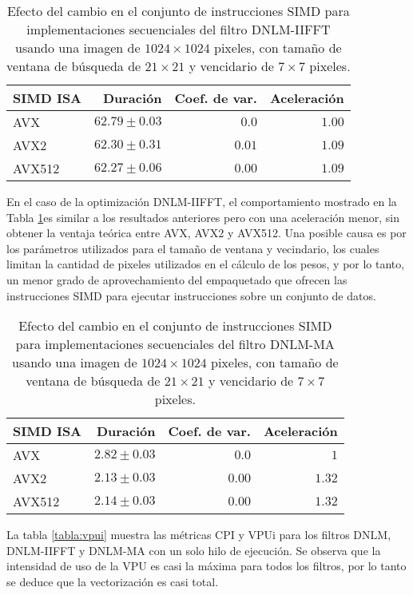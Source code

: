 \begin{table}
\protect\caption[Efecto de vectorizaci\'on con instrucciones SIMD para el filtro DNLM-IIFFT]{Efecto del cambio en el conjunto de instrucciones SIMD para implementaciones secuenciales del filtro DNLM-IIFFT usando una imagen de  $1024 \times 1024$ pixeles, con tama\~no de ventana de b\'usqueda de $21 \times 21$ y vencidario de $7 \times 7$ pixeles. \label{tabla:vec_dnlm_iifft}}
\centering
\begin{tabular}{lrrr}
SIMD ISA & Duraci\'on \left[s\right]& Coef. de var. & Aceleraci\'on \left[x\right] \tabularnewline
\hline
AVX & $62.79\pm0.03$ & $0.0$ & $1.00$\tabularnewline
AVX2 & $62.30\pm0.31$ & $0.01$ & $1.09$\tabularnewline
AVX512 & $62.27\pm 0.06$ & $0.00$ & $1.09$ \tabularnewline
\end{tabular}
\end{table}


En el caso de la optimizaci\'on DNLM-IIFFT, el comportamiento mostrado en la Tabla \ref{tabla:vec_dnlm_iifft}es similar a los resultados anteriores pero con una aceleraci\'on menor, sin obtener la ventaja te\'orica entre AVX, AVX2 y AVX512. Una posible causa es por los par\'ametros utilizados para el tama\~no de ventana y vecindario, los cuales limitan la cantidad de pixeles utilizados en el c\'alculo de los pesos, y por lo tanto, un menor grado de aprovechamiento del empaquetado que ofrecen las instrucciones SIMD para ejecutar instrucciones sobre un conjunto de datos.

\begin{table}
\protect\caption[Efecto de vectorizaci\'on con instrucciones SIMD para el filtro DNLM-MA]{Efecto del cambio en el conjunto de instrucciones SIMD para implementaciones secuenciales del filtro DNLM-MA usando una imagen de  $1024 \times 1024$ pixeles, con tama\~no de ventana de b\'usqueda de $21 \times 21$ y vencidario de $7 \times 7$ pixeles. \label{tabla:vec_dnlm_MA}}
\centering
\begin{tabular}{lrrr}
SIMD ISA & Duraci\'on \left[s\right]& Coef. de var. & Aceleraci\'on \left[x\right] \tabularnewline
\hline
AVX & $2.82\pm0.03$ & $0.0$ & $1$\tabularnewline
AVX2 & $2.13\pm0.03$ & $0.00$ & $1.32$\tabularnewline
AVX512 & $2.14\pm 0.03$ & $0.00$ & $1.32$ \tabularnewline
\end{tabular}
\end{table}

La tabla \ref{tabla:vpui} muestra las m\'etricas CPI y VPUi para los filtros DNLM, DNLM-IIFFT y DNLM-MA con un solo hilo de ejecuci\'on. Se observa que la intensidad de uso de la VPU es casi la m\'axima para todos los filtros, por lo tanto se deduce que la vectorizaci\'on es casi total.

